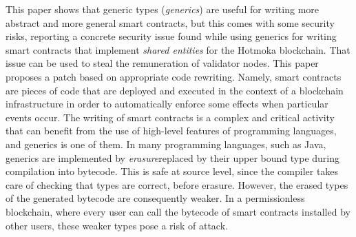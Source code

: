 This paper shows that generic types (\emph{generics}) are useful for writing more abstract and more general smart contracts, but this comes with some security risks, reporting a concrete security issue found while using generics for writing smart contracts that implement \emph{shared entities} for the Hotmoka blockchain. That issue can be used to steal the remuneration of validator nodes. This paper proposes a patch based on appropriate code rewriting. Namely, smart contracts are pieces of code that are deployed and executed in the context of a blockchain infrastructure in order to automatically enforce some effects when particular events occur. The writing of smart contracts is a complex and critical activity that can benefit from the use of high-level features of programming languages, and generics is one of them. In many programming languages, such as Java, generics are implemented by \emph{erasure}\ie replaced by their upper bound type during compilation into bytecode. This is safe at source level, since the compiler takes care of checking that types are correct, before erasure. However, the erased types of the generated bytecode are consequently weaker. In a permissionless blockchain, where every user can call the bytecode of smart contracts installed by other users, these weaker types pose a risk of attack.
